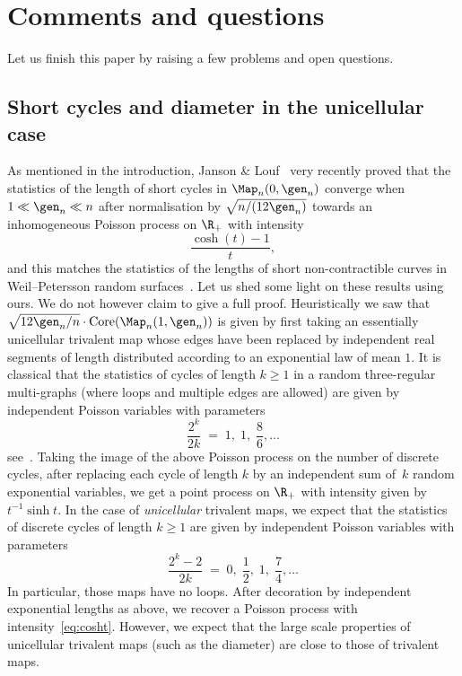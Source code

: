 \section{Comments and questions}
\label{sec:comments}

Let us finish this paper by raising a few problems and open questions.

\subsection{Short cycles and diameter in the unicellular case}

As mentioned in the introduction, Janson \& Louf~\cite{JL21b} very recently proved that the statistics of the length of short cycles in $ \Map_{n}(0, \gen_{n})$ converge when $ 1 \ll \gen_n \ll n$ after normalisation by $ \sqrt{n/(12 \gen_{n})}$ towards an inhomogeneous Poisson process on $\R_{+}$ with intensity
\begin{equation}\label{eq:cosht}
\frac{\cosh (t)-1}{t},
\end{equation}
and this matches the statistics of the lengths of short non-contractible curves in Weil--Petersson random surfaces~\cite{MP19}. Let us shed some light on these results using ours. We do not however claim to give a full proof. Heuristically we saw that $ \sqrt{12 \gen_{n}/n} \cdot \mathrm{Core}(\Map_{n}(1, \gen_n))$ is given by first taking an essentially unicellular trivalent map whose edges have been replaced by independent real segments of length distributed according to an exponential law of mean $1$.
It is classical that the statistics of cycles of length $k\geq 1$ in a random three-regular multi-graphs (where loops and multiple edges are allowed) are given by independent Poisson variables with parameters
\[
\frac{2^k}{2k} \;=\; 1,\;1,\;\frac{8}{6}, \dots
\]
see~\cite[Th.\,2.5]{Wor99}. Taking the image of the above Poisson process on the number of discrete cycles, after replacing each cycle of length $k$ by an independent sum of~$k$ random exponential variables, we get a point process on $\R_{+}$ with intensity given by $t^{-1} \sinh t$. In the case of \emph{unicellular} trivalent maps, we expect that the statistics of discrete cycles of length $k\geq 1$ are given by independent Poisson variables with parameters
\[
\frac{2^{k}-2}{2k} \;=\; 0,\;\frac{1}{2},\;1,\;\frac{7}{4}, \dots
\]
In particular, those maps have no loops. After decoration by independent exponential lengths as above, we recover a Poisson process with intensity~\eqref{eq:cosht}. However, we expect that the large scale properties of unicellular trivalent maps (such as the diameter) are close to those of trivalent maps.

